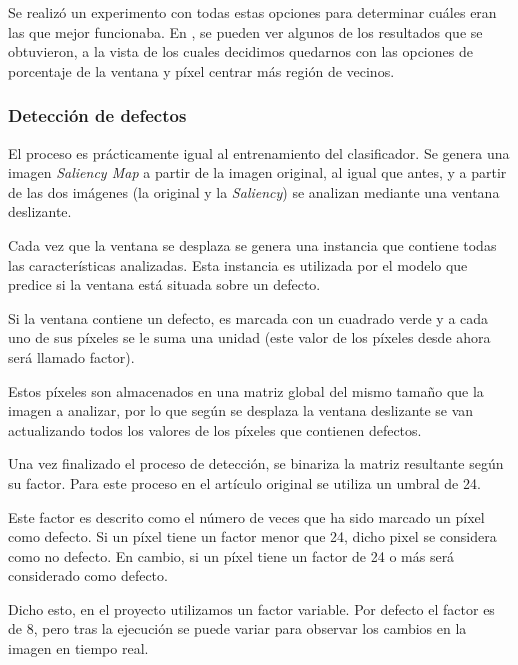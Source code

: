 Se realizó un experimento con todas estas opciones para determinar cuáles eran las que mejor funcionaba. En , se pueden ver algunos de los resultados que se obtuvieron, a la vista de los cuales decidimos quedarnos con las opciones de porcentaje de la ventana y píxel centrar más región de vecinos.



\subsubsection{Detección de defectos}
El proceso es prácticamente igual al entrenamiento del clasificador. Se genera una imagen \emph{Saliency Map} a partir de la imagen original, al igual que antes, y a partir de las dos imágenes (la original y la \emph{Saliency}) se analizan mediante una ventana deslizante.

Cada vez que la ventana se desplaza se genera una instancia que contiene todas las características analizadas. Esta instancia es utilizada por el modelo que predice si la ventana está situada sobre un defecto.

Si la ventana contiene un defecto, es marcada con un cuadrado verde y a cada uno de sus píxeles se le suma una unidad (este valor de los píxeles desde ahora será llamado factor).

Estos píxeles son almacenados en una matriz global del mismo tamaño que la imagen a analizar, por lo que según se desplaza la ventana deslizante se van actualizando todos los valores de los píxeles que contienen defectos.

Una vez finalizado el proceso de detección, se binariza la matriz resultante según su factor. Para este proceso en el artículo original \cite{DomingoMery} se utiliza un umbral de 24.

Este factor es descrito como el número de veces que ha sido marcado un píxel como defecto. Si un píxel tiene un factor menor que 24, dicho pixel se considera como no defecto. En cambio, si un píxel tiene un factor de 24 o más será considerado como defecto.

Dicho esto, en el proyecto utilizamos un factor variable. Por defecto el factor es de 8, pero tras la ejecución se puede variar para observar los cambios en la imagen en tiempo real.

